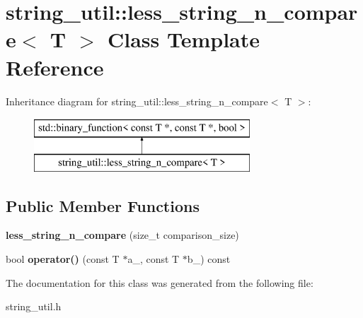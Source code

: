 \section{string\+\_\+util\+:\+:less\+\_\+string\+\_\+n\+\_\+compare$<$ T $>$ Class Template Reference}
\label{classstring__util_1_1less__string__n__compare}
Inheritance diagram for string\+\_\+util\+:\+:less\+\_\+string\+\_\+n\+\_\+compare$<$ T $>$\+:\begin{figure}[H]
\begin{center}
\leavevmode
\includegraphics[height=2.000000cm]{classstring__util_1_1less__string__n__compare}
\end{center}
\end{figure}
\subsection*{Public Member Functions}
\begin{DoxyCompactItemize}
\item 
{\bfseries less\+\_\+string\+\_\+n\+\_\+compare} (size\+\_\+t comparison\+\_\+size)\label{classstring__util_1_1less__string__n__compare_a42b269c0aa27c5ace8b3eeb782f6d335}

\item 
bool {\bfseries operator()} (const T $\ast$a\+\_\+, const T $\ast$b\+\_\+) const \label{classstring__util_1_1less__string__n__compare_ab6f6bb1fbd6421cb848bba88ce18f6e0}

\end{DoxyCompactItemize}


The documentation for this class was generated from the following file\+:\begin{DoxyCompactItemize}
\item 
string\+\_\+util.\+h\end{DoxyCompactItemize}
